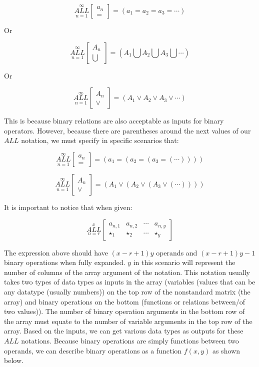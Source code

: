 \documentclass{article}
\begin{document}
$$\underset{n=1}{\overset{\infty}{ALL}} \begin{bmatrix}
a_n \\
=
\end{bmatrix} = (a_1=a_2=a_3=\cdots)$$

Or

$$\underset{n=1}{\overset{\infty}{ALL}} \begin{bmatrix}
A_n \\
\bigcup
\end{bmatrix} = (A_1 \bigcup A_2 \bigcup A_3 \bigcup \cdots)$$

Or

$$\underset{n=1}{\overset{\infty}{ALL}} \begin{bmatrix}
A_n \\
\vee
\end{bmatrix} = (A_1 \vee A_2 \vee A_3 \vee \cdots)$$

This is because binary relations are also acceptable as inputs for binary operators. However, because there are parentheses around the next values of our $ALL$ notation, we must specify in specific scenarios that:

$$\underset{n=1}{\overset{\infty}{ALL}} \begin{bmatrix}
a_n \\
=
\end{bmatrix} = (a_1=(a_2=(a_3=(\cdots))))$$

$$\underset{n=1}{\overset{\infty}{ALL}} \begin{bmatrix}
A_n \\
\vee
\end{bmatrix} = (A_1 \vee (A_2 \vee (A_3 \vee (\cdots))))$$


It is important to notice that when given:

$$\underset{n=r}{\overset{x}{ALL}} \begin{bmatrix}
a_{n,1} & a_{n,2} & \cdots & a_{n,y} \\
\star_1 & \star_2 & \cdots & \star_y
\end{bmatrix}$$

The expression above should have $(x-r+1)y$ operands and $(x-r+1)y-1$ binary operations when fully expanded. $y$ in this scenario will represent the number of columns of the array argument of the notation. This notation usually takes two types of data types as inputs in the array (variables (values that can be any datatype (usually numbers)) on the top row of the nonstandard matrix (the array) and binary operations on the bottom (functions or relations between/of two values)). The number of binary operation arguments in the bottom row of the array must equate to the number of variable arguments in the top row of the array. Based on the inputs, we can get various data types as outputs for these $ALL$ notations. Because binary operations are simply functions between two operands, we can describe binary operations as a function $f(x,y)$ as shown below.
\end{document}

